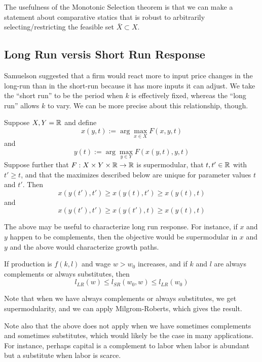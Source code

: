 The usefulness of the Monotonic Selection theorem is that we can make
a statement about comparative statics that is robust to arbitrarily
selecting/restricting the feasible set $\bar X \subset X$.

\subsection{Long Run versis Short Run Response}
\label{sec:LR-SR}

Samuelson suggested that a firm would react more to input price
changes in the long-run than in the short-run because it has more
inputs it can adjust. We take the ``short run'' to be the period when
$k$ is effectively fixed, whereas the ``long run'' allows $k$ to
vary. We can be more precise about this relationship, though.

\begin{prop}
  Suppose $X, Y = {\mathbb R}$ and define
  \[
  x(y, t) := \arg \max_{x \in X} F(x,y,t)
  \]
  and
  \[
  y(t) := \arg \max_{y \in Y} F(x(y, t), y, t)
  \]
  Suppose further that $F: X \times Y \times {\mathbb R} \to {\mathbb R}$ is
  supermodular, that $t, t' \in {\mathbb R} $ with $t' \geq t$, and that the
  maximizes described below are unique for parameter values $t$ and
  $t'$. Then
  \[
  x(y(t'), t') \geq x(y(t), t') \geq x(y(t), t)
  \]
  and
  \[
  x(y(t'), t') \geq x(y(t'), t) \geq x(y(t), t)
  \]
\end{prop}

The above may be useful to characterize long run response. For
instance, if $x$ and $y$ happen to be complements, then the objective
would be supermodular in $x$ and $y$ and the above would characterize
growth paths.

\begin{prop}
  If production is $f(k,l)$ and wage $w > w_0$ increases, and if $k$
  and $l$ are always complements or always substitutes, then
  \[
  l_{LR}(w) \leq l_{SR}(w_0, w) \leq l_{LR}(w_0)
  \]
\end{prop}

Note that when we have always complements or always substitutes, we
get supermodularity, and we can apply Milgrom-Roberts, which gives the
result.

Note also that the above does not apply when we have sometimes complements
and sometimes substitutes, which would likely be the case in many
applications. For instance, perhaps capital is a complement to labor
when labor is abundant but a substitute when labor is scarce.
